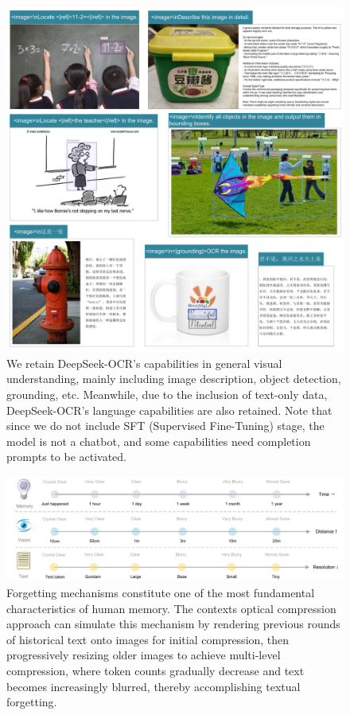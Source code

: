 \documentclass[11pt, a4paper, logo, copyright, nonumbering]{deepseek}
\begin{document}
\begin{CJK*}{UTF8}{gbsn}
\begin{figure}[!h]
	\centering
    \includegraphics[width=1.0\linewidth]{figures/10.pdf}
	\caption{We retain DeepSeek-OCR's capabilities in general visual understanding, mainly including image description, object detection, grounding, etc. Meanwhile, due to the inclusion of text-only data, DeepSeek-OCR's language capabilities are also retained. Note that since we do not include SFT (Supervised Fine-Tuning) stage, the model is not a chatbot, and some capabilities need completion prompts to be activated.}
	\label{fig:16}
\end{figure}


\begin{figure}[!t]
	\centering
    \includegraphics[width=1.0\linewidth]{figures/4.pdf}
	\caption{Forgetting mechanisms constitute one of the most fundamental characteristics of human memory. The contexts optical compression approach can simulate this mechanism by rendering previous rounds of historical text onto images for initial compression, then progressively resizing older images to achieve multi-level compression, where token counts gradually decrease and text becomes increasingly blurred, thereby accomplishing textual forgetting.}
	\label{fig:17}
\end{figure}


\end{CJK*}
\end{document}
